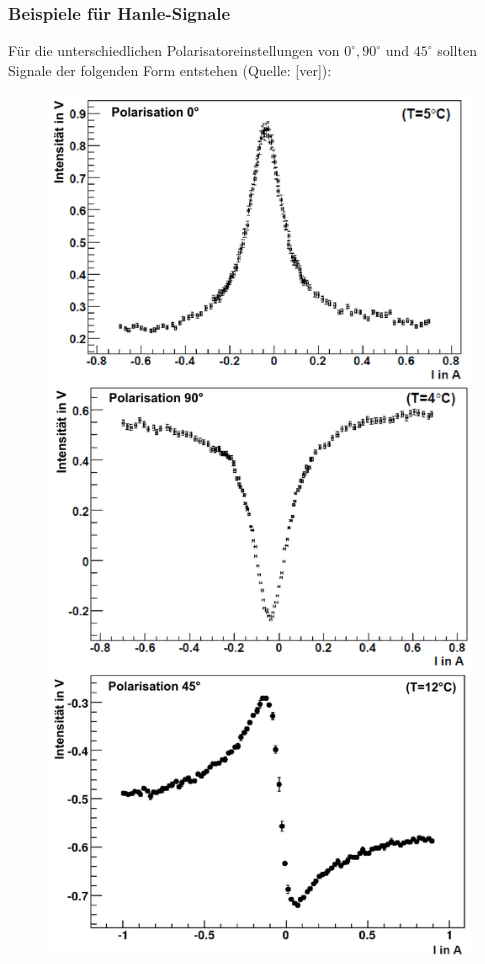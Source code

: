 \subsubsection{Beispiele für Hanle-Signale}
Für die unterschiedlichen Polarisatoreinstellungen von $0^{\circ}, 90^{\circ}$ und $45^{\circ}$ sollten Signale der folgenden Form entstehen (Quelle: [ver]):
\begin{center}
\begin{figure}[h]
\hspace{3.0 cm}
\includegraphics[scale=0.26]{Bilder/signale}
\end{figure}
\end{center}
\clearpage
